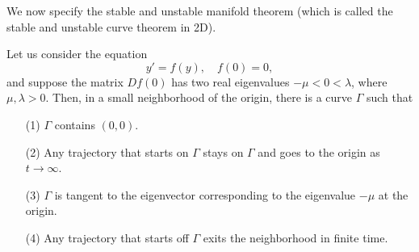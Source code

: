 \documentclass{article}
\begin{document}
    We now specify the stable and unstable manifold theorem (which is called the stable and unstable curve theorem in 2D). 
    
    \begin{theorem}{}
        Let us consider the equation 
        \[
            y' = f(y), \quad f(0) = 0,
        \]
        and suppose the matrix $Df(0)$ has two real eigenvalues $-\mu < 0 < \lambda$, where $\mu, \lambda > 0$. Then, in a small neighborhood of the origin, there is a curve $\Gamma$ such that 
        \begin{enumerate}
            \item[(1)] $\Gamma$ contains $(0, 0)$.
            \item[(2)] Any trajectory that starts on $\Gamma$ stays on $\Gamma$ and goes to the origin as $t \to \infty$. 
            \item[(3)] $\Gamma$ is tangent to the eigenvector corresponding to the eigenvalue $-\mu$ at the origin. 
            \item[(4)] Any trajectory that starts off $\Gamma$ exits the neighborhood in finite time.    
        \end{enumerate}
    \end{theorem}
\end{document}
